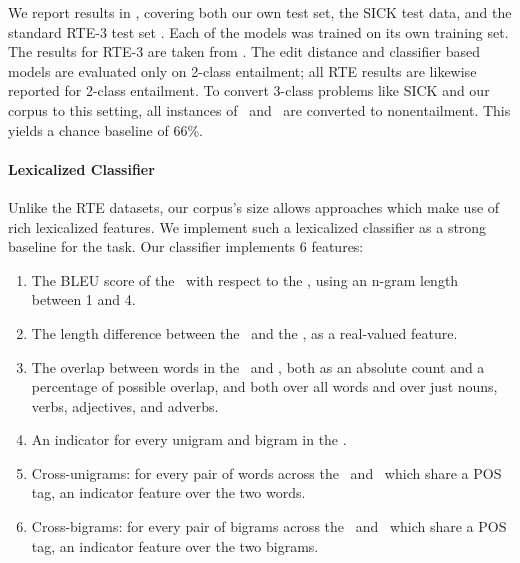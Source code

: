 We report results in , covering both our own test set,
  the SICK test data, and the standard RTE-3 test set \cite{giampiccolo2007third}.
Each of the models was trained on its own training set.
The results for RTE-3 are taken from .
The edit distance and classifier based models are evaluated only on
  2-class entailment; all RTE results are likewise reported for 2-class entailment.
To convert 3-class problems like SICK and our corpus to this setting, all instances
  of \contradiction\ and \unknown\ are converted to nonentailment.
This yields a chance baseline of 66\%.


%
%
\paragraph{Lexicalized Classifier}
Unlike the RTE datasets, our corpus's size allows approaches which make use of
  rich lexicalized features.
We implement such a lexicalized classifier as a strong baseline 
  for the task.
Our classifier implements 6 features:
\begin{enumerate}
\setlength\itemsep{-0.25em}
  \item The BLEU score of the \hypothesis\ with respect
  to the \premise, using an n-gram length between 1 and 4.

  \item The length difference between the \hypothesis\ and the \premise, as a real-valued
  feature.

  \item The overlap between words in the \premise\ and \hypothesis,
  both as an absolute count and a percentage of possible overlap, and both over 
  all words and over just nouns, verbs, adjectives, 
  and adverbs.
  
  \item\label{lst:ngram} An indicator for every unigram and bigram in the \hypothesis.

  \item\label{lst:unigram} Cross-unigrams: for every pair of words across the \premise\ and \hypothesis\ which share a 
  POS tag, an indicator feature over the two words.
  
  \item\label{lst:bigram} Cross-bigrams: for every pair of bigrams across the \premise\ and \hypothesis\ which share a 
  POS tag, an indicator feature over the two bigrams.
\end{enumerate}

